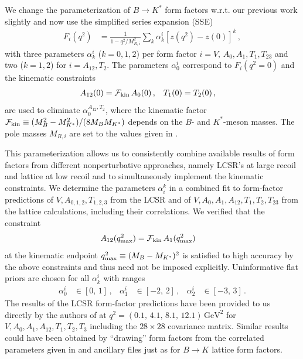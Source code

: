 \documentclass[twocolumn,epjc3]{svjour3}
\numberwithin{equation}{section}
\renewcommand{\[}{\big[}
\renewcommand{\]}{\big]}
\renewcommand{\(}{\big(}
\renewcommand{\)}{\big)}
\begin{document}
We change the parameterization of $B\to K^*$ form factors w.r.t. our previous
work \cite{Beaujean:2013soa} slightly and now use the simplified series
expansion (SSE) \cite{Bharucha:2010im}
\begin{align}
  \label{eq:SSE-FF-parameterization}
  F_i(q^2) & =
  \frac{1}{1 - q^2/M_{R,i}^2} \sum_k \alpha_k^i \left[z(q^2) - z(0)\right]^k \,,
\end{align}
with three parameters $\alpha_k^i$ ($k=0,1,2$) per form factor $i = V,\, A_0,A_1,
T_1,T_{23}$ and two ($k=1,2$) for $i= A_{12}, T_2$. The parameters $\alpha_0^i$
correspond to $F_i(q^2 = 0)$ and the kinematic constraints
\begin{align}
  A_{12}(0) & = {\cal F}_{\rm kin}\, A_0(0) \,, &
  T_1(0) & = T_2(0) \,,
\end{align}
are used to eliminate $\alpha_0^{A_{12}, T_2}$, where the kinematic factor
${\cal F}_{\rm kin} \equiv (M_B^2 - M_{K^*}^2)/(8 M_B M_{K^*})$ depends on the
$B$- and $K^*$-meson masses. The {pole} masses $M_{R,i}$ are set to
the values given in \cite{Straub:2015ica}.

This parameterization allows us to consistently combine available results of
form factors from different nonperturbative approaches, namely LCSR's at large
recoil and lattice at low recoil and to simultaneously implement the kinematic
constraints. We determine the parameters $\alpha_i^k$ in a combined fit to
form-factor predictions of $V, A_{0,1,2},T_{1,2,3}$ from the LCSR
\cite{Straub:2015ica} and of $V, A_0,A_1,A_{12},T_1,T_2,T_{23}$ from the lattice
\cite{Horgan:2013hoa, Horgan:2015vla} calculations, including their
correlations. We verified that the  constraint
\begin{align}
  \label{eq:A12-constraint-q2max}
  A_{12}(q_{\rm max}^2) & = {\cal F}_{\rm kin}\, A_1(q_{\rm max}^2)
\end{align}
at the kinematic endpoint $q_{\rm max}^2 \equiv (M_B - M_{K^*})^2$ is satisfied
to high accuracy by the above constraints and thus need not be imposed
explicitly. Uninformative flat priors are chosen for all $\alpha_k^i$ with
ranges
\begin{align}
  \alpha_0^i & \in [0,\, 1] \,, &
  \alpha_{1}^i & \in [-2,\, 2]  \,, &
  \alpha_{2}^i & \in [-3,\, 3] \,.
\end{align}
The results of the LCSR form-factor predictions have been provided to us
directly by the authors of \cite{Straub:2015ica} at $q^2 = (0.1,\, 4.1,\, 8.1,\,
12.1)\, \mbox{GeV}^2$ for $V, A_0,A_1,A_{12},T_1,T_2,T_{3}$ including the
$28\times 28$ covariance matrix. Similar results could have been obtained by
``drawing'' form factors from the correlated parameters given in
\cite{Straub:2015ica} and ancillary files just as for $B \to K$ lattice form
factors.
\end{document}
